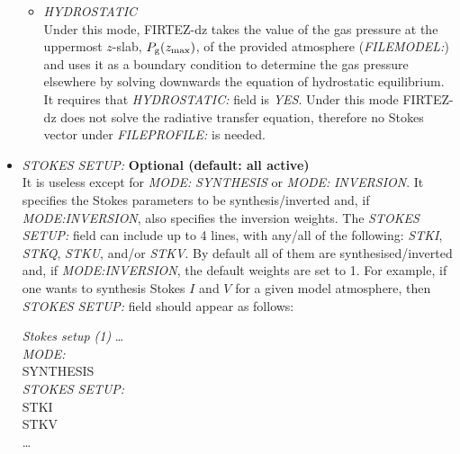 \begin{itemize}
\begin{itemize}
    \item {\it HYDROSTATIC}\\
    Under this mode, FIRTEZ-dz takes the value of the gas pressure at the uppermost $z$-slab, $P_{\rm g}(z_{\rm max})$, of the provided atmosphere  ({\it FILEMODEL:}) and uses it as a boundary condition to determine the gas pressure elsewhere by solving downwards the equation of hydrostatic equilibrium. It requires that {\it HYDROSTATIC:} field is {\it YES}. Under this mode FIRTEZ-dz does not solve the radiative transfer equation, therefore no Stokes vector under {\it FILEPROFILE:} is needed.

  \end{itemize}
  \item {\it STOKES SETUP:} {\bf Optional (default: all active)}\\

  It is useless except for {\it MODE:} {\it SYNTHESIS} or {\it MODE:} {\it INVERSION}. It specifies the Stokes parameters to be synthesis/inverted and, if {\it MODE:}{\it INVERSION}, also specifies the inversion weights. The {\it STOKES SETUP:} field can include up to 4 lines, with any/all of the following: {\it STKI}, {\it STKQ}, {\it STKU}, and/or {\it STKV}. By default all of them are synthesised/inverted and, if {\it MODE:}{\it INVERSION}, the default weights are set to 1. For example, if one wants to synthesis Stokes $I$ and $V$ for a given model atmosphere, then {\it STOKES SETUP:} field should appear as follows:\\
\begin{ifbox}[label={tb:stokes_setup1}]{{\it Stokes setup (1)}}
  \scriptsize
  \ldots\\
  {\it MODE:}\\
  SYNTHESIS\\
  {\it STOKES SETUP:}\\
  STKI\\
  STKV\\
  \ldots
  \normalsize
\end{ifbox}
  

\end{itemize}
